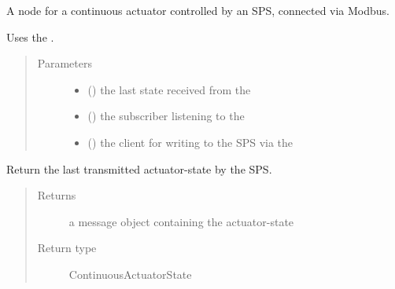 \documentclass[a4paper,12pt,twoside]{article}
\begin{document}
\begin{fulllineitems}
\label{\detokenize{meso_control_pkg:meso_control_pkg.sps_continuous_actuator_node.SpsContinuousActuator}}
A node for a continuous actuator controlled by an SPS, connected via Modbus.

Uses the .
\begin{quote}\begin{description}
\item[{Parameters}] \leavevmode\begin{itemize}
\item {} 
 () \textendash{} the last state received from the 

\item {} 
 () \textendash{} the subscriber listening to the 

\item {} 
 () \textendash{} the client for writing to the SPS via the 

\end{itemize}

\end{description}\end{quote}

\begin{fulllineitems}
\label{\detokenize{meso_control_pkg:meso_control_pkg.sps_continuous_actuator_node.SpsContinuousActuator.poll_status}}
Return the last transmitted actuator-state by the SPS.
\begin{quote}\begin{description}
\item[{Returns}] \leavevmode
a message object containing the actuator-state

\item[{Return type}] \leavevmode
ContinuousActuatorState


\end{description}
\end{quote}
\end{fulllineitems}
\end{fulllineitems}
\end{document}
